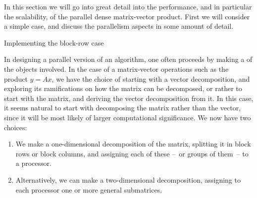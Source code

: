 In this section we will go into great detail into the performance, and
in particular the scalability, of the parallel dense matrix-vector
product. First we will consider a simple case, and discuss the
parallelism aspects in some amount of detail.

 {Implementing the block-row case}
\label{sec:blockrow}

In designing a parallel version of an algorithm, one often proceeds by
making a  of the objects involved. In
the case of a matrix-vector operations such as the product $y=Ax$, we
have the choice of starting with a vector decomposition, and exploring
its ramifications on how the matrix can be decomposed, or rather to
start with the matrix, and deriving the vector decomposition from it.
In this case, it seems natural to start with decomposing the matrix
rather than the vector, since it will be most likely of larger
computational significance. We now have two choices:
\begin{enumerate}
\item We make a one-dimensional decomposition of the matrix, splitting
  it in block rows or block columns, and assigning each of these --~or
  groups of them~-- to a processor.
\item Alternatively, we can make a two-dimensional decomposition,
  assigning to each processor one or more general submatrices.
\end{enumerate}

